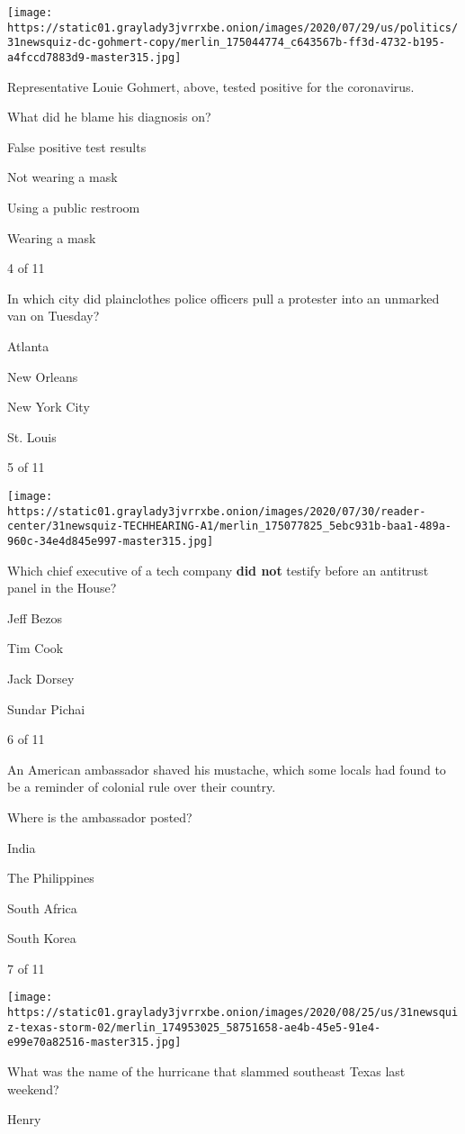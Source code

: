 \texttt{[image: https://static01.graylady3jvrrxbe.onion/images/2020/07/29/us/politics/31newsquiz-dc-gohmert-copy/merlin\_175044774\_c643567b-ff3d-4732-b195-a4fccd7883d9-master315.jpg]}

Representative Louie Gohmert, above, tested positive for the
coronavirus.

What did he blame his diagnosis on?

False positive test results

Not wearing a mask

Using a public restroom

Wearing a mask

4 of 11

In which city did plainclothes police officers pull a protester into an
unmarked van on Tuesday?

Atlanta

New Orleans

New York City

St. Louis

5 of 11

\texttt{[image: https://static01.graylady3jvrrxbe.onion/images/2020/07/30/reader-center/31newsquiz-TECHHEARING-A1/merlin\_175077825\_5ebc931b-baa1-489a-960c-34e4d845e997-master315.jpg]}

Which chief executive of a tech company \textbf{did not} testify before
an antitrust panel in the House?

Jeff Bezos

Tim Cook

Jack Dorsey

Sundar Pichai

6 of 11

An American ambassador shaved his mustache, which some locals had found
to be a reminder of colonial rule over their country.

Where is the ambassador posted?

India

The Philippines

South Africa

South Korea

7 of 11

\texttt{[image: https://static01.graylady3jvrrxbe.onion/images/2020/08/25/us/31newsquiz-texas-storm-02/merlin\_174953025\_58751658-ae4b-45e5-91e4-e99e70a82516-master315.jpg]}

What was the name of the hurricane that slammed southeast Texas last
weekend?

Henry

